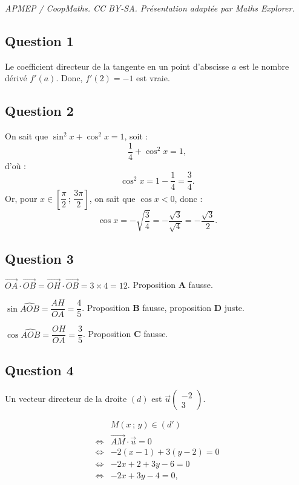 \documentclass[10pt]{article}
\begin{document}
\noindent\textit{APMEP / CoopMaths. CC BY-SA. Présentation adaptée par Maths Explorer.}\par\medskip
\subsection*{Question 1}

Le coefficient directeur de la tangente en un point d'abscisse \(a\) est le nombre dérivé \(f'(a)\). Donc, \(f'(2) = -1\) est vraie.

\subsection*{Question 2}

On sait que \(\sin^2 x + \cos^2 x = 1\), soit :
\[
\dfrac{1}{4} + \cos^2 x = 1,
\]
d'où :
\[
\cos^2 x = 1 - \dfrac{1}{4} = \dfrac{3}{4}.
 \]
Or, pour \( x \in \left[\dfrac{\pi}{2} \,;\, \dfrac{3\pi}{2}\right] \), on sait que \(\cos x < 0\), donc :
\[
\cos x = -\sqrt{\dfrac{3}{4}} = -\dfrac{\sqrt{3}}{\sqrt{4}} = -\dfrac{\sqrt{3}}{2}.
\]

\subsection*{Question 3}

\(\overrightarrow{OA} \cdot \overrightarrow{OB} = \overrightarrow{OH} \cdot \overrightarrow{OB} = 3 \times 4 = 12\). Proposition \textbf{A} fausse.

\(\sin \widehat{AOB} = \dfrac{AH}{OA} = \dfrac{4}{5}\). Proposition \textbf{B} fausse, proposition \textbf{D} juste.

\(\cos \widehat{AOB} = \dfrac{OH}{OA} = \dfrac{3}{5}\). Proposition \textbf{C} fausse.

\subsection*{Question 4}

Un vecteur directeur de la droite \((d)\) est \(\vec{u} \begin{pmatrix} -2 \\ 3 \end{pmatrix}\).

\begin{align*}
&M(x \,;\, y) \in (d') \\
\iff &\overrightarrow{AM} \cdot \vec{u} = 0 \\
\iff &-2(x - 1) + 3(y - 2) = 0 \\
\iff &-2x + 2 + 3y - 6 = 0 \\
\iff &-2x + 3y - 4 = 0,
\end{align*}
\end{document}
